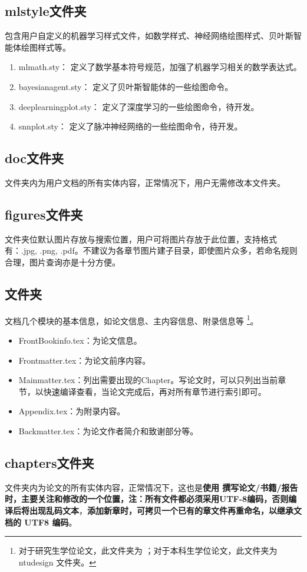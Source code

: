 \subsection{mlstyle文件夹}
包含用户自定义的机器学习样式文件，如数学样式、神经网络绘图样式、贝叶斯智能体绘图样式等。
\begin{enumerate}
    \item mlmath.sty： 定义了数学基本符号规范，加强了机器学习相关的数学表达式。
    \item bayesianagent.sty： 定义了贝叶斯智能体的一些绘图命令。
    \item deeplearningplot.sty： 定义了深度学习的一些绘图命令，待开发。
    \item snnplot.sty： 定义了脉冲神经网络的一些绘图命令，待开发。
\end{enumerate}

\subsection{doc文件夹}
文件夹内为用户文档的所有实体内容，正常情况下，用户无需修改本文件夹。


\subsection{figures文件夹}
文件夹位默认图片存放与搜索位置，用户可将图片存放于此位置，支持格式有：.jpg, .png, .pdf。不建议为各章节图片建子目录，即使图片众多，若命名规则合理，图片查询亦是十分方便。

\subsection{ \projectname 文件夹}
文档几个模块的基本信息，如论文信息、主内容信息、附录信息等 \footnote{对于研究生学位论文，此文件夹为 \projectname；对于本科生学位论文，此文件夹为 ntudesign 文件夹。}。
\begin{itemize}
    \item FrontBookinfo.tex：为论文信息。
    \item Frontmatter.tex：为论文前序内容。
    \item Mainmatter.tex：列出需要出现的Chapter。写论文时，可以只列出当前章节，以快速编译查看，当论文完成后，再对所有章节进行索引即可。
    \item Appendix.tex：为附录内容。
    \item Backmatter.tex：为论文作者简介和致谢部分等。
\end{itemize}

\subsection{chapters文件夹}
文件夹内为论文的所有实体内容，正常情况下，这也是\textbf{使用 \projectname 撰写论文/书籍/报告时，主要关注和修改的一个位置，注：所有文件都必须采用UTF-8编码，否则编译后将出现乱码文本}，\textbf{添加新章时，可拷贝一个已有的章文件再重命名，以继承文档的 UTF8 编码}。

